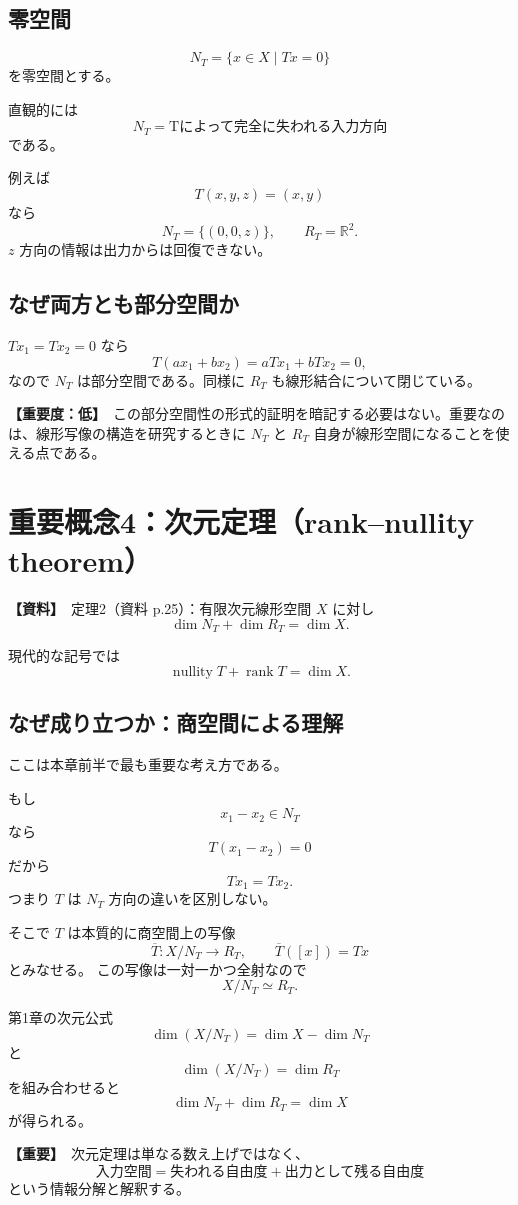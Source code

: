 \documentclass[a4paper,11pt]{ltjsarticle}
\newcommand{\R}{\mathbb{R}}
\newcommand{\rank}{\operatorname{rank}}
\newcommand{\nullity}{\operatorname{nullity}}
\newcommand{\sourceitem}{\textbf{【資料】}}
\newcommand{\lowimportance}{\textbf{【重要度：低】}}
\newcommand{\highimportance}{\textbf{【重要】}}
\begin{document}
\subsection{零空間}
\[
\boxed{N_T=\{x\in X\mid Tx=0\}}
\]
を零空間とする。

直観的には
\[
\boxed{N_T=\text{Tによって完全に失われる入力方向}}
\]
である。

例えば
\[
T(x,y,z)=(x,y)
\]
なら
\[
N_T=\{(0,0,z)\},\qquad R_T=\R^2.
\]
$z$ 方向の情報は出力からは回復できない。

\subsection{なぜ両方とも部分空間か}
$Tx_1=Tx_2=0$ なら
\[
T(ax_1+bx_2)=aTx_1+bTx_2=0,
\]
なので $N_T$ は部分空間である。同様に $R_T$ も線形結合について閉じている。

\lowimportance\ この部分空間性の形式的証明を暗記する必要はない。重要なのは、線形写像の構造を研究するときに $N_T$ と $R_T$ 自身が線形空間になることを使える点である。

\section{重要概念4：次元定理（rank--nullity theorem）}

\sourceitem\ 定理2（資料 p.25）：有限次元線形空間 $X$ に対し
\[
\boxed{\dim N_T+\dim R_T=\dim X.}
\]

現代的な記号では
\[
\boxed{\nullity T+\rank T=\dim X.}
\]

\subsection{なぜ成り立つか：商空間による理解}
ここは本章前半で最も重要な考え方である。

もし
\[
x_1-x_2\in N_T
\]
なら
\[
T(x_1-x_2)=0
\]
だから
\[
Tx_1=Tx_2.
\]
つまり $T$ は $N_T$ 方向の違いを区別しない。

そこで $T$ は本質的に商空間上の写像
\[
\overline T:X/N_T\to R_T,
\qquad
\overline T([x])=Tx
\]
とみなせる。
この写像は一対一かつ全射なので
\[
\boxed{X/N_T\simeq R_T.}
\]

第1章の次元公式
\[
\dim(X/N_T)=\dim X-\dim N_T
\]
と
\[
\dim(X/N_T)=\dim R_T
\]
を組み合わせると
\[
\dim N_T+\dim R_T=\dim X
\]
が得られる。

\highimportance\ 次元定理は単なる数え上げではなく、
\[
\boxed{\text{入力空間}=\text{失われる自由度}+\text{出力として残る自由度}}
\]
という情報分解と解釈する。
\end{document}
